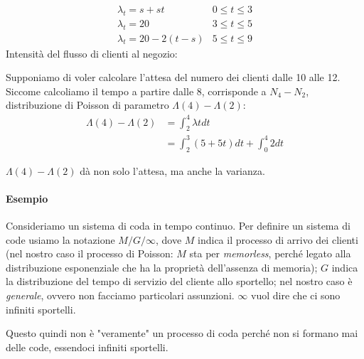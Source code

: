 \documentclass[a4paper,12pt]{book}
\begin{document}
$$ \begin{array}{cc}
	\lambda_t = s + st & 0 \le t \le 3 \\
	\lambda_t = 20 & 3 \le t \le 5 \\
	\lambda_t = 20 - 2(t-s) & 5 \le t \le 9
\end{array}
$$
Intensità del flusso di clienti al negozio:
\begin{center}
\end{center}

Supponiamo di voler calcolare l'attesa del numero dei clienti dalle 10 alle 12. Siccome calcoliamo il tempo a partire dalle 8, %
corrisponde a $ N_4 - N_2 $, distribuzione di Poisson di parametro $\Lambda(4) - \Lambda(2)$:
\begin{align*}
	\Lambda(4) - \Lambda(2) & = \int_2^4 \lambda t dt \\
	& = \int_{2}^{3} (5 + 5t) dt + \int_{0}^{4} 2 dt
\end{align*}

$\Lambda(4) - \Lambda(2)$ dà non solo l'attesa, ma anche la varianza.

\paragraph{Esempio} 
Consideriamo un sistema di coda in tempo continuo. Per definire un sistema di code usiamo la notazione $M/G/\infty$, dove $ M $ indica il processo di arrivo dei clienti (nel nostro caso il processo di Poisson: $ M $ sta per \textit{memorless}, perché legato alla distribuzione esponenziale che ha la proprietà dell'assenza di memoria); $ G $ indica la distribuzione del tempo di servizio del cliente allo sportello; nel nostro caso è \textit{generale}, ovvero non facciamo particolari assunzioni. $\infty$ vuol dire che ci sono infiniti sportelli.

Questo quindi non è "veramente" un processo di coda perché non si formano mai delle code, essendoci infiniti sportelli. 
\end{document}
